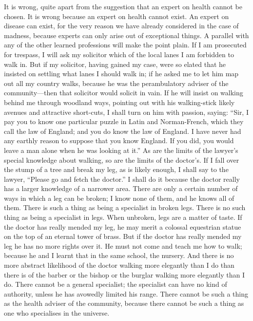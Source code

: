 \documentclass{book}
\begin{document}
It is wrong, quite apart from the suggestion that an expert on health cannot be chosen. It is wrong because an expert on health cannot exist. An expert on disease can exist, for the very reason we have already considered in the case of madness, because experts can only arise out of exceptional things. A parallel with any of the other learned professions will make the point plain. If I am prosecuted for trespass, I will ask my solicitor which of the local lanes I am forbidden to walk in. But if my solicitor, having gained my case, were so elated that he insisted on settling what lanes I should walk in; if he asked me to let him map out all my country walks, because he was the perambulatory adviser of the community—then that solicitor would solicit in vain. If he will insist on walking behind me through woodland ways, pointing out with his walking-stick likely avenues and attractive short-cuts, I shall turn on him with passion, saying: “Sir, I pay you to know one particular puzzle in Latin and Norman-French, which they call the law of England; and you do know the law of England. I have never had any earthly reason to suppose that you know England. If you did, you would leave a man alone when he was looking at it.” As are the limits of the lawyer’s special knowledge about walking, so are the limits of the doctor’s. If I fall over the stump of a tree and break my leg, as is likely enough, I shall say to the lawyer, “Please go and fetch the doctor.” I shall do it because the doctor really has a larger knowledge of a narrower area. There are only a certain number of ways in which a leg can be broken; I know none of them, and he knows all of them. There is such a thing as being a specialist in broken legs. There is no such thing as being a specialist in legs. When unbroken, legs are a matter of taste. If the doctor has really mended my leg, he may merit a colossal equestrian statue on the top of an eternal tower of brass. But if the doctor has really mended my leg he has no more rights over it. He must not come and teach me how to walk; because he and I learnt that in the same school, the nursery. And there is no more abstract likelihood of the doctor walking more elegantly than I do than there is of the barber or the bishop or the burglar walking more elegantly than I do. There cannot be a general specialist; the specialist can have no kind of authority, unless he has avowedly limited his range. There cannot be such a thing as the health adviser of the community, because there cannot be such a thing as one who specialises in the universe.
\end{document}
